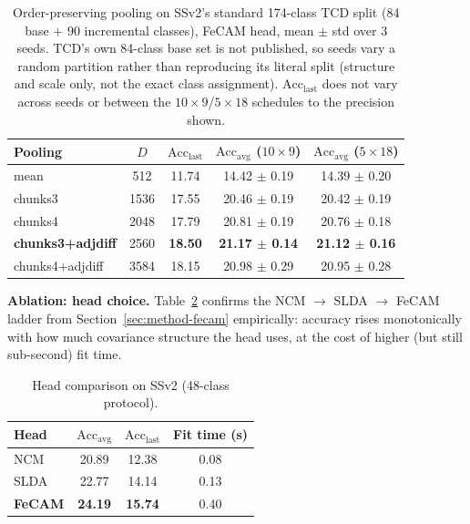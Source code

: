 \documentclass[11pt]{article}
\begin{document}
\begin{table}[h]
\centering
\caption{Order-preserving pooling on SSv2's standard 174-class TCD split
(84 base $+$ 90 incremental classes), FeCAM head, mean $\pm$ std over 3
seeds. TCD's own 84-class base set is not published, so seeds vary a
random partition rather than reproducing its literal split (structure and
scale only, not the exact class assignment).
$\mathrm{Acc}_{\mathrm{last}}$ does not vary across seeds or between the
$10{\times}9$/$5{\times}18$ schedules to the precision shown.}
\label{tab:ssv2-174}
\small
\begin{tabular}{@{}lcccc@{}}
\toprule
Pooling & $D$ & $\mathrm{Acc}_{\mathrm{last}}$ & $\mathrm{Acc}_{\mathrm{avg}}$ ($10{\times}9$) & $\mathrm{Acc}_{\mathrm{avg}}$ ($5{\times}18$) \\
\midrule
mean & 512 & 11.74 & 14.42 $\pm$ 0.19 & 14.39 $\pm$ 0.20 \\
chunks3 & 1536 & 17.55 & 20.46 $\pm$ 0.19 & 20.42 $\pm$ 0.19 \\
chunks4 & 2048 & 17.79 & 20.81 $\pm$ 0.19 & 20.76 $\pm$ 0.18 \\
\textbf{chunks3+adjdiff} & 2560 & \textbf{18.50} & \textbf{21.17 $\pm$ 0.14} & \textbf{21.12 $\pm$ 0.16} \\
chunks4+adjdiff & 3584 & 18.15 & 20.98 $\pm$ 0.29 & 20.95 $\pm$ 0.28 \\
\bottomrule
\end{tabular}
\end{table}

\textbf{Ablation: head choice.} Table~\ref{tab:head-ladder} confirms the
NCM $\to$ SLDA $\to$ FeCAM ladder from Section~\ref{sec:method-fecam}
empirically: accuracy rises monotonically with how much covariance
structure the head uses, at the cost of higher (but still sub-second) fit
time.

\begin{table}[h]
\centering
\caption{Head comparison on SSv2 (48-class protocol).}
\label{tab:head-ladder}
\small
\begin{tabular}{@{}lccc@{}}
\toprule
Head & $\mathrm{Acc}_{\mathrm{avg}}$ & $\mathrm{Acc}_{\mathrm{last}}$ & Fit time (s) \\
\midrule
NCM & 20.89 & 12.38 & 0.08 \\
SLDA & 22.77 & 14.14 & 0.13 \\
\textbf{FeCAM} & \textbf{24.19} & \textbf{15.74} & 0.40 \\
\bottomrule
\end{tabular}
\end{table}
\end{document}
